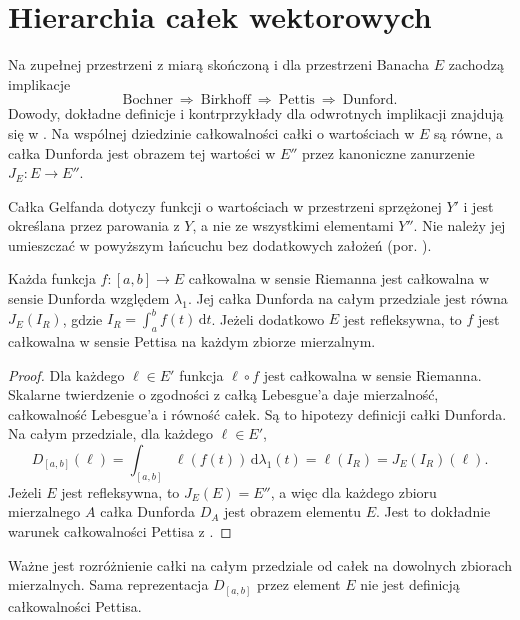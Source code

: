 \section{Hierarchia całek wektorowych}

Na zupełnej przestrzeni z miarą skończoną
i dla przestrzeni Banacha $E$ zachodzą implikacje
\[
 \text{Bochner}\ \Longrightarrow\
 \text{Birkhoff}\ \Longrightarrow\
 \text{Pettis}\ \Longrightarrow\
 \text{Dunford}.
\]
Dowody, dokładne definicje i kontrprzykłady
dla odwrotnych implikacji znajdują się w
.
Na wspólnej dziedzinie całkowalności całki
o wartościach w $E$ są równe, a całka Dunforda
jest obrazem tej wartości w $E''$ przez
kanoniczne zanurzenie $J_E:E\to E''$.

Całka Gelfanda dotyczy funkcji o wartościach
w przestrzeni sprzężonej $Y'$ i jest określana
przez parowania z $Y$, a nie ze wszystkimi
elementami $Y''$. Nie należy jej umieszczać
w powyższym łańcuchu bez dodatkowych założeń
(por. ).

\begin{stwierdzenie}
\label{ma2:prop:vector-riemann-weak}
Każda funkcja $f:[a,b]\to E$ całkowalna
w sensie Riemanna jest całkowalna
w sensie Dunforda względem $\lambda_1$.
Jej całka Dunforda na całym przedziale
jest równa $J_E(I_R)$, gdzie
$I_R=\int_a^b f(t)\,\mathrm dt$.
Jeżeli dodatkowo $E$ jest refleksywna,
to $f$ jest całkowalna w sensie Pettisa
na każdym zbiorze mierzalnym.
\end{stwierdzenie}
\begin{proof}
Dla każdego $\ell\in E'$ funkcja $\ell\circ f$
jest całkowalna w sensie Riemanna.
Skalarne twierdzenie o zgodności z całką Lebesgue'a
daje mierzalność, całkowalność Lebesgue'a
i równość całek. Są to hipotezy definicji
całki Dunforda.
Na całym przedziale, dla każdego $\ell\in E'$,
\[
 D_{[a,b]}(\ell)
 =\int_{[a,b]}\ell(f(t))\,\mathrm d\lambda_1(t)
 =\ell(I_R)=J_E(I_R)(\ell).
\]
Jeżeli $E$ jest refleksywna, to $J_E(E)=E''$,
a więc dla każdego zbioru mierzalnego $A$
całka Dunforda $D_A$ jest obrazem elementu $E$.
Jest to dokładnie warunek całkowalności
Pettisa z
.
\end{proof}

Ważne jest rozróżnienie całki na całym
przedziale od całek na dowolnych zbiorach
mierzalnych. Sama reprezentacja $D_{[a,b]}$
przez element $E$ nie jest definicją
całkowalności Pettisa.

